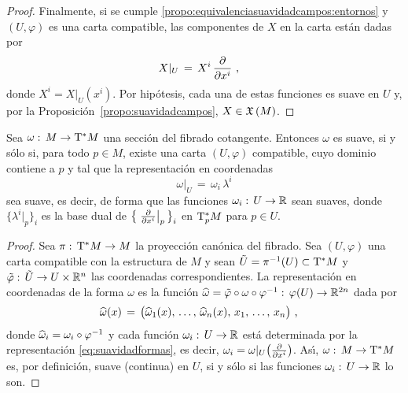 \begin{proof}
	Finalmente, si se cumple
	\ref{propo:equivalenciasuavidadcampos:entornos} y $(U,\varphi)$ es una
	carta compatible, las componentes de $X$ en la carta est\'{a}n dadas
	por
	\begin{align*}
		X|_U & \,=\, X^i\,\gancho{x^i}
		\text{ ,}
	\end{align*}
	donde $X^i=X|_U(x^i)$. Por hip\'{o}tesis, cada una de estas funciones
	es suave en $U$ y, por la Proposici\'{o}n~\ref{propo:suavidadcampos},
	$X\in\mathfrak{X}\left(M\right)$.
\end{proof}

\begin{propoSuavidadFormas}\label{propo:suavidadformas}
	Sea $\omega:\,M\rightarrow\tangente*{M}$ una secci\'{o}n del fibrado
	cotangente. Entonces $\omega$ es suave, si y s\'{o}lo si, para todo
	$p\in M$, existe una carta $(U,\varphi)$ compatible, cuyo dominio
	contiene a $p$ y tal que la representaci\'{o}n en coordenadas
	\begin{equation}\label{eq:suavidadformas}
		\omega|_U \,=\,\omega_i\,\lambda^i
	\end{equation}
	sea suave, es decir, de forma que las funciones
	$\omega_i:\,U\rightarrow\mathbb{R}$ sean suaves, donde
	$\big\{\lambda^i|_p\big\}_i$ es la base dual de
	$\big\{\gancho[p]{x^i}\big\}_i$ en $\tangente*[p]{M}$ para $p\in U$.
\end{propoSuavidadFormas}

\begin{proof}
	Sea $\pi:\,\tangente*{M}\rightarrow M$ la proyecci\'{o}n can\'{o}nica
	del fibrado. Sea $(U,\varphi)$ una carta compatible con la estructura
	de $M$ y sean $\delfibrado{U}=\pi^{-1}(U)\subset\tangente*{M}$ y
	$\tilde{\varphi}:\,\tilde{U}\rightarrow U\times\mathbb{R}^n$ las
	coordenadas correspondientes. La representaci\'{o}n en coordenadas de
	la forma $\omega$ es la funci\'{o}n
	\begin{math}
		\widehat{\omega}=
			\tilde{\varphi}\circ\omega\circ\varphi^{-1}:\,
			\varphi(U)\rightarrow\mathbb{R}^{2n}
	\end{math} dada por
	\begin{align*}
		\encoordenadas{\omega}(x) & \,=\,\big(
			\encoordenadas{\omega}_1(x),\,\dots,\,
			\encoordenadas{\omega}_n(x),\,\lista{x}{n}\big)
		\text{ ,}
	\end{align*}
	donde $\widehat{\omega}_i=\omega_i\circ\varphi^{-1}$ y cada
	funci\'{o}n $\omega_i:\,U\rightarrow\mathbb{R}$ est\'{a} determinada por la
	representaci\'{o}n \eqref{eq:suavidadformas}, es decir,
	$\omega_i=\omega|_U\big(\gancho{x^i}\big)$. As\'{\i},
	$\omega:\,M\rightarrow\tangente*{M}$ es, por definici\'{o}n, suave
	(continua) en $U$, si y s\'{o}lo si las funciones
	$\omega_i:\,U\rightarrow\mathbb{R}$ lo son.
\end{proof}

